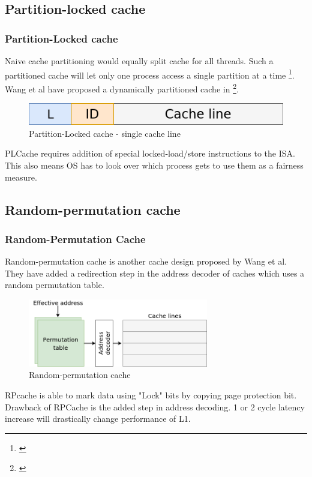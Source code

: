 \documentclass[10pt]{beamer}
\begin{document}
\subsection{Partition-locked cache}

\begin{frame}
\frametitle{Partition-Locked cache}
Naive cache partitioning would equally split cache for all threads.
    Such a partitioned cache will let only one process access a single partition at a time \footnote{\cite{part_cache}}.
    Wang et al have proposed a dynamically partitioned cache in \footnote{\cite{wang}}.
\begin{figure}[h]
\centering
\includegraphics[width=\textwidth]{figures/pl-cache}
\caption{Partition-Locked cache - single cache line}
\end{figure}
PLCache requires addition of special locked-load/store instructions to the ISA.
This also means OS has to look over
which process gets to use them as a fairness measure.
\end{frame}

\subsection{Random-permutation cache}

\begin{frame}
\frametitle{Random-Permutation Cache}
Random-permutation cache is another cache design proposed by Wang et al. They
have added a redirection step in the address decoder of caches which uses a random permutation table.
\begin{figure}[h]
\centering
\includegraphics[width=0.7\textwidth]{figures/rp-cache}
\caption{Random-permutation cache}
\end{figure}
RPcache is able to mark data using "Lock" bits by copying page protection bit.
Drawback of RPCache is the added step in address decoding.
1 or 2 cycle latency increase will drastically change performance of L1.
\end{frame}
\end{document}
